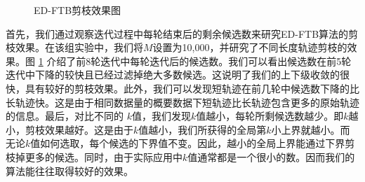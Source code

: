 \begin{figure}[t]
	\centering
		\centering
		\caption{ED-FTB剪枝效果图}
		\label{fig:ED-DTKTS}
\end{figure}
首先，我们通过观察迭代过程中每轮结束后的剩余候选数来研究ED-FTB算法的剪枝效果。在该组实验中，我们将$M$设置为10,000，并研究了不同长度轨迹剪枝的效果。图 \ref{fig:ED-DTKTS} 介绍了前8轮迭代中每轮迭代后的候选数。我们可以看出候选数在前5轮迭代中下降的较快且已经过滤掉绝大多数候选。这说明了我们的上下级收敛的很快，具有较好的剪枝效果。此外，我们可以发现短轨迹在前几轮中候选数下降的比长轨迹快。这是由于相同数据量的概要数据下短轨迹比长轨迹包含更多的原始轨迹的信息。最后，对比不同的 $k$值，我们发现$k$值越小，每轮所剩候选数越少。即$k$越小，剪枝效果越好。这是由于$k$值越小，我们所获得的全局第$k$小上界就越小。而无论$k$值如何选取，每个候选的下界值不变。因此，越小的全局上界能通过下界剪枝掉更多的候选。同时，由于实际应用中$k$值通常都是一个很小的数。因而我们的算法能往往取得较好的效果。

